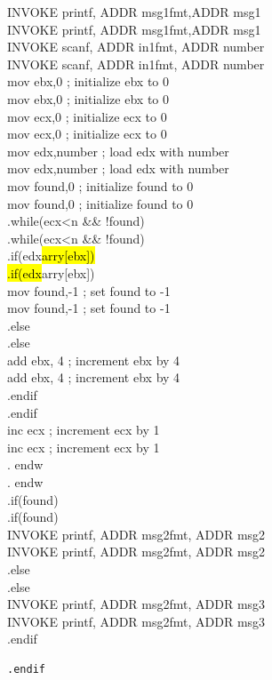 \documentclass[10pt]{book}
\begin{document}
INVOKE printf, ADDR msg1fmt,ADDR msg1\\
INVOKE printf, ADDR msg1fmt,ADDR msg1\\
INVOKE scanf, ADDR in1fmt, ADDR number\\
INVOKE scanf, ADDR in1fmt, ADDR number\\
mov ebx,0 ; initialize ebx to 0\\
mov ebx,0 ; initialize ebx to 0\\
mov ecx,0 ; initialize ecx to 0\\
mov ecx,0 ; initialize ecx to 0\\
mov edx,number ; load edx with number\\
mov edx,number ; load edx with number\\
mov found,0 ; initialize found to 0\\
mov found,0 ; initialize found to 0\\
.while(ecx<n \&\& !found)\\
.while(ecx<n \&\& !found)\\
.if(edx\hl{arry[ebx])\\
.if(edx}arry[ebx])\\
mov found,-1 ; set found to -1\\
mov found,-1 ; set found to -1\\
.else\\
.else\\
add ebx, 4 ; increment ebx by 4\\
add ebx, 4 ; increment ebx by 4\\
.endif\\
.endif\\
inc ecx ; increment ecx by 1\\
inc ecx ; increment ecx by 1\\
. endw\\
. endw\\
.if(found)\\
.if(found)\\
INVOKE printf, ADDR msg2fmt, ADDR msg2\\
INVOKE printf, ADDR msg2fmt, ADDR msg2\\
.else\\
.else\\
INVOKE printf, ADDR msg2fmt, ADDR msg3\\
INVOKE printf, ADDR msg2fmt, ADDR msg3\\
.endif

\begin{verbatim}
.endif
\end{verbatim}
\end{document}
